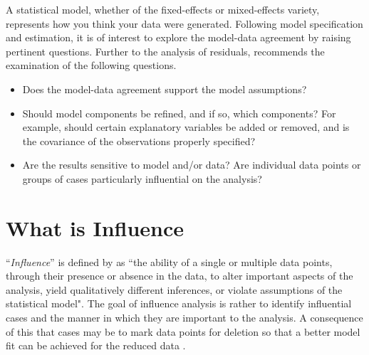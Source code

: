 \documentclass[12pt, a4paper]{report}
\theoremstyle{plain}
\theoremstyle{definition}
\theoremstyle{remark}
\begin{document}
A statistical model, whether of the fixed-effects or mixed-effects variety, represents how you think your data were generated. Following model specification and estimation, it is of interest to explore the model-data
agreement by raising pertinent questions. Further to the analysis of residuals, \citet{schab} recommends the examination of the following questions.
\begin{itemize}
	\item Does the model-data agreement support the model assumptions?
	\item Should model components be refined, and if so, which components? For example, should certain explanatory variables
	be added or removed, and is the covariance of the observations properly specified?
	\item Are the results sensitive to model and/or data? Are individual data points or groups of cases particularly
	influential on the analysis?
\end{itemize}

%



\section{What is Influence} %
``\textit{Influence}” is defined by \citet{schabenberger} as ``the ability of a single or multiple data points, through their presence
or absence in the data, to alter important aspects of the analysis, yield qualitatively different inferences, or
violate assumptions of the statistical model". The goal of influence analysis is rather to identify influential cases and the manner in
which they are important to the analysis. A consequence of this that cases may be to mark data points for deletion so that a better model fit can be achieved for the reduced data \citep{schabenberger}.  

\end{document}
